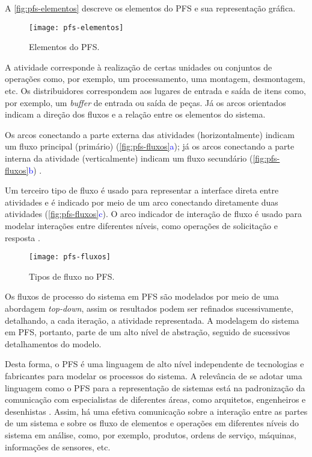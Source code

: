 A \autoref{fig:pfs-elementos} descreve os elementos do PFS e sua representação gráfica.

\begin{figure}[t]
	\centering
	\texttt{[image: pfs-elementos]}
	\caption{Elementos do PFS.}
	\label{fig:pfs-elementos}
\end{figure}

A atividade corresponde à realização de certas unidades ou conjuntos de operações como, por exemplo, um processamento, uma montagem, desmontagem, etc. Os distribuidores correspondem aos lugares de entrada e saída de itens como, por exemplo, um \textit{buffer} de entrada ou saída de peças. Já os arcos orientados indicam a direção dos fluxos e a relação entre os elementos do sistema.

Os arcos conectando a parte externa das atividades (horizontalmente) indicam um fluxo principal (primário) (\autoref{fig:pfs-fluxos}\textcolor{blue}{a}); já os arcos conectando a parte interna da atividade (verticalmente) indicam um fluxo secundário (\autoref{fig:pfs-fluxos}\textcolor{blue}{b}) \cite{miyagi1996controle}.

Um terceiro tipo de fluxo é usado para representar a interface direta entre atividades e é indicado por meio de um arco conectando diretamente duas atividades (\autoref{fig:pfs-fluxos}\textcolor{blue}{c}). O arco indicador de interação de fluxo é usado para modelar interações entre diferentes níveis, como operações de solicitação e resposta \cite{pisching2018pfs}.

\begin{figure}[t]
	\centering
	\texttt{[image: pfs-fluxos]}
	\caption{Tipos de fluxo no PFS.}
	\label{fig:pfs-fluxos}
\end{figure}

Os fluxos de processo do sistema em PFS são modelados por meio de uma abordagem \textit{top-down}, assim os resultados podem ser refinados sucessivamente, detalhando, a cada iteração, a atividade representada. A modelagem do sistema em PFS, portanto, parte de um alto nível de abstração, seguido de sucessivos detalhamentos do modelo.

Desta forma, o PFS é uma linguagem de alto nível independente de tecnologias e fabricantes para modelar os processos do sistema. A relevância de se adotar uma linguagem como o PFS para a representação de sistemas está na padronização da comunicação com especialistas de diferentes áreas, como arquitetos, engenheiros e desenhistas \cite{pisching2018pfs}. Assim, há uma efetiva comunicação sobre a interação entre as partes de um sistema e sobre os fluxo de elementos e operações em diferentes níveis do sistema em análise, como, por exemplo, produtos, ordens de serviço, máquinas, informações de sensores, etc.
